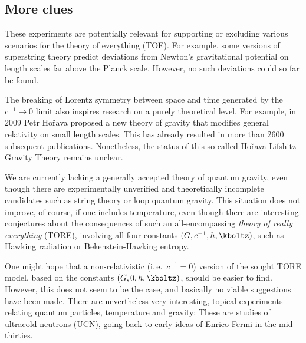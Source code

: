 \documentclass{scrartcl}
\begin{document}
\subsection*{More clues}

These experiments are potentially relevant for supporting or excluding various scenarios for the theory of everything (TOE). For example, some versions of superstring theory predict deviations from Newton's gravitational potential on length scales far above the Planck scale. However, no such deviations could so far be found.

The breaking of Lorentz symmetry between space and time generated by the $c^{−1}\rightarrow 0$ limit also inspires research on a purely theoretical level. For example, in 2009 Petr Hořava proposed a new theory of gravity that modifies general relativity on small length scales. This has already resulted in more than \num{2600} subsequent publications. Nonetheless, the status of this so-called Hořava-Lifshitz Gravity Theory remains unclear.



\newpage {}
\label{sec:1011}

We are currently lacking a generally accepted theory of quantum gravity, even though there are experimentally unverified and theoretically incomplete candidates such as string theory or loop quantum gravity. This situation does not improve,  of course, if one includes temperature, even though there are interesting conjectures about the consequences of such an all-encompassing \emph{theory of really everything} (TORE), involving all four constants $(G,c^{-1},h,\kboltz)$, such as Hawking radiation or Bekenstein-Hawking entropy.

One might hope that a non-relativistic (i.\,e.\ $c^{-1}=0$) version of the sought TORE model, based on the constants $(G,0,h,\kboltz)$, should be easier to find. However, this does not seem to be the case, and basically no viable suggestions have been made. There are nevertheless very interesting, topical experiments relating quantum particles, temperature and gravity: These are studies of ultracold neutrons (UCN), going back to early ideas of Enrico Fermi in the mid-thirties.
\end{document}
